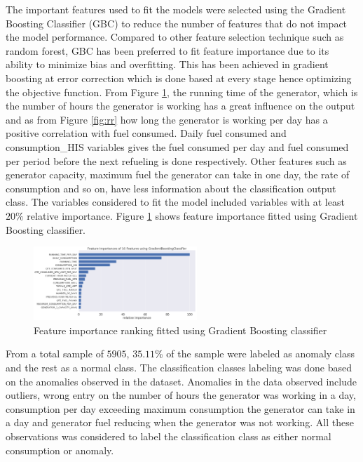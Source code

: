 \documentclass[final,5p,times,twocolumn,authoryear]{elsarticle}
\begin{document}
The important features used to fit the models were selected using the
Gradient Boosting Classifier (GBC) to reduce the number of features that do not impact the model performance. Compared to other feature selection technique such as random forest, GBC has been preferred to fit feature importance due to its ability to minimize bias and overfitting. This has been achieved in gradient boosting at error correction which is done based at every stage hence optimizing the objective function. From Figure \ref{fig:feature}, the running time of the generator, which is the number of hours the generator is working has a great influence on the output and as from Figure \ref{fig:rr} how long the generator is working per day has a positive correlation with fuel consumed. Daily fuel consumed and consumption\_HIS variables gives the fuel consumed per day and fuel consumed per period before the next refueling is done respectively. Other features such as generator capacity, maximum fuel the generator can take in one day, the rate of consumption and so on, have less information about the classification output class. The variables considered to fit the model included variables with at least $20\%$ relative importance. Figure  \ref{fig:feature} shows feature importance fitted  using Gradient Boosting classifier.
	  
 \begin{figure}[H]
      \centering
      \includegraphics[width=0.55\textwidth]{Figures/Feature_importance} 
    
     \caption{Feature importance ranking fitted using Gradient Boosting classifier }
    \label{fig:feature}
   \end{figure} 
From a total sample of $5905$, $35.11$\%  of the sample were labeled as anomaly class and the rest as a normal class. The classification classes labeling was done based on the anomalies observed in the dataset.  Anomalies in the data observed include outliers, wrong entry on the number of hours the generator was working in a day, consumption per day exceeding maximum consumption the generator can take in a day and generator fuel reducing when the generator was not working. All these observations was considered to label the classification class as either normal consumption or anomaly. 
\end{document}
